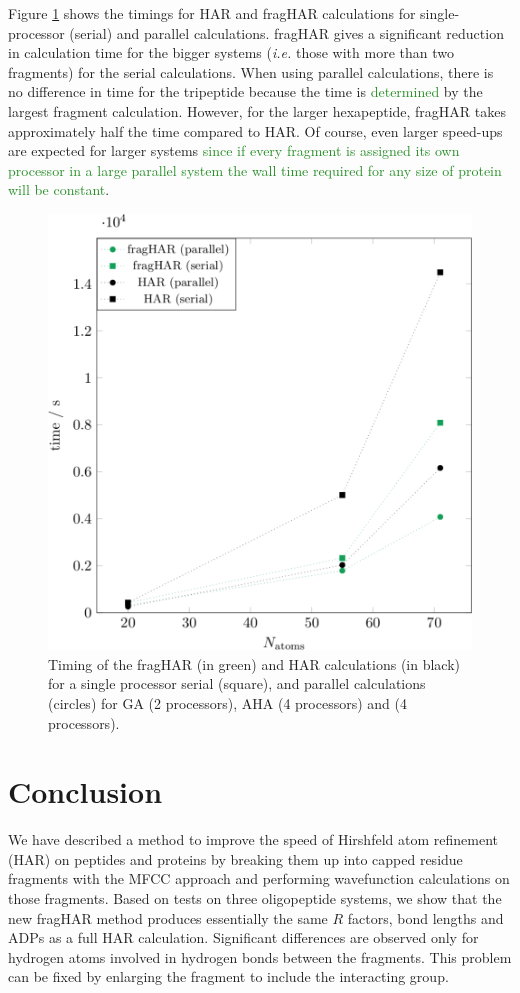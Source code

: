 \documentclass[preprint,dvipsnames]{iucr}              %
\newcommand{\changed}[1]{\textcolor{ForestGreen}{#1}}
\begin{document}
Figure \ref{fig_timing} shows the timings for HAR and fragHAR calculations
for single-processor (serial) and parallel calculations. fragHAR gives a significant 
reduction in calculation time for the bigger systems ({\em i.e.} those with more than
two fragments) for the serial calculations. 
When using parallel calculations, there is no difference
in time for the tripeptide because the time is \changed{determined} 
by the largest fragment
calculation. However, for the larger hexapeptide, fragHAR takes approximately 
half the time compared to HAR. Of course, even larger speed-ups are expected 
for larger systems \changed{since if every fragment is assigned its own processor 
in a large parallel system the wall time required for any size of protein will 
be constant}.

\begin{figure}
 \centering
 \includegraphics[width=0.8\linewidth]{graph_timing.png}
\caption{Timing of the fragHAR (in green) and HAR calculations (in black) 
for a single processor serial (square), and parallel calculations (circles)
for GA (2 processors),  AHA (4 processors) and  (4 processors). }
\label{fig_timing}
\end{figure}



\section{Conclusion}

We have described a method to improve the speed of Hirshfeld 
atom refinement (HAR) on peptides and proteins by breaking them 
up into capped residue fragments with the MFCC approach and performing wavefunction calculations
on those fragments. Based on tests on three oligopeptide systems, we show that the new
fragHAR method produces essentially the same $R$ factors, bond lengths and ADPs as  a full HAR calculation.
Significant differences are observed only for
hydrogen atoms involved in hydrogen bonds 
between the fragments. This problem can 
be fixed by enlarging the fragment to include the interacting group.
\end{document}
